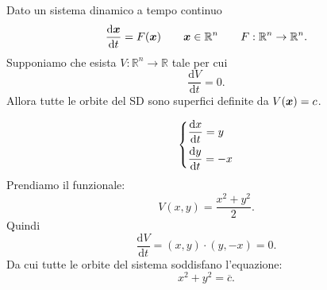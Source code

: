 \noindent
Dato un sistema dinamico a tempo continuo
\[
    \frac{\text{d} \boldsymbol{x}}{\text{d} t} = F(\boldsymbol{x}) \qquad  \boldsymbol{x}\in \mathbb{R}^n \qquad  F: \mathbb{R}^n\to \mathbb{R}^n
.\] 
Supponiamo che esista $V: \mathbb{R}^n\to \mathbb{R}$  tale per cui
\[
    \frac{\text{d} V}{\text{d} t} = 0
.\] 
Allora tutte le orbite del SD sono superfici definite da $V(\boldsymbol{x}) = c$.
\begin{exmp}[Oscillatore]
    \[
    \begin{dcases}
    \frac{\text{d} x}{\text{d} t} = y\\
    \frac{\text{d} y}{\text{d} t} = -x
    \end{dcases}
    \]
    Prendiamo il funzionale:
    \[
	V(x, y) = \frac{x^2+y^2}{2}
    .\] 
    Quindi 
    \[
	\frac{\text{d} V}{\text{d} t} = (x, y) \cdot (y, -x) = 0
    .\] 
    Da cui tutte le orbite del sistema soddisfano l'equazione:
    \[
        x^2+ y^2 = \overline{c}
    .\] 
\end{exmp}
